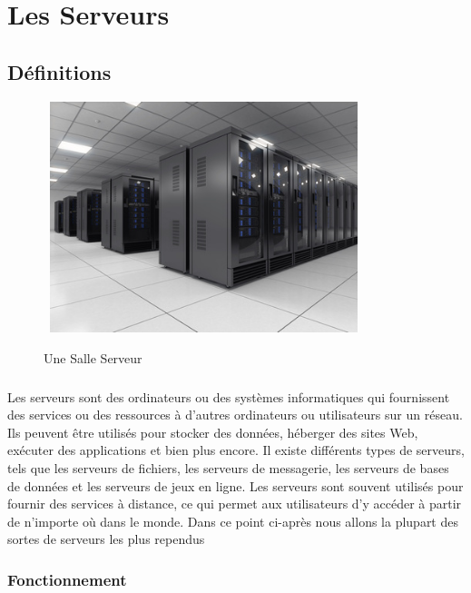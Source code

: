  
 
  \chapter{ Les Serveurs}
 \section{Définitions}

	\begin{figure}[h]
		 \begin{center}
		\hbox{ \includegraphics[width=0.8\textwidth]{PhotoMemoire/salle-serveur.jpg}}
		\caption{Une Salle Serveur}
	\end{center}
	\end{figure}

\paragraph{ }
Les serveurs sont des ordinateurs ou des systèmes informatiques qui fournissent des services ou des ressources à d'autres ordinateurs ou utilisateurs sur un réseau. Ils peuvent être utilisés pour stocker des données, héberger des sites Web, exécuter des applications et bien plus encore. Il existe différents types de serveurs, tels que les serveurs de fichiers, les serveurs de messagerie, les serveurs de bases de données et les serveurs de jeux en ligne. Les serveurs sont souvent utilisés pour fournir des services à distance, ce qui permet aux utilisateurs d'y accéder à partir de n'importe où dans le monde.
 Dans ce point ci-après nous allons la plupart des sortes de serveurs les plus rependus 
 \subsection*{Fonctionnement}
